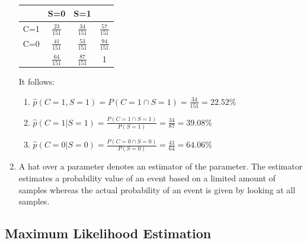 \documentclass[12pt]{article}
\begin{document}
\begin{enumerate}
\begin{table}[h!]
		\begin{tabular}{|c|c|c|c|}
			\toprule
			& S=0   & S=1   &  \\
			\midrule
			C=1   & $\frac{23}{151}$    & $\frac{34}{151}$    & $\frac{57}{151}$  \\
			\midrule
			C=0   & $\frac{41}{151}$    & $\frac{53}{151}$    & $\frac{94}{151}$  \\
			\midrule
			& $\frac{64}{151}$  & $\frac{87}{151}$  & 1 \\
			\bottomrule
		\end{tabular}%
	\end{table}%
	It follows:
	\begin{enumerate}[label=(\alph*)]
		\item $\hat{p}(C=1,S=1)=P(C=1\cap S=1)=\frac{34}{151}=22.52\%$
		\item $\hat{p}(C=1|S=1)=\frac{P(C=1\cap S=1)}{P(S=1)}=\frac{34}{87}=39.08\%$
		\item $\hat{p}(C=0|S=0)=\frac{P(C=0\cap S=0)}{P(S=0)}=\frac{41}{64}=64.06\%$
	\end{enumerate}
	\item A hat over a parameter denotes an estimator of the parameter. The estimator estimates a probability value of an event based on a limited amount of samples whereas the actual probability of an event is given by looking at all samples.    
\end{enumerate}

\subsection{Maximum Likelihood Estimation}
\end{document}
